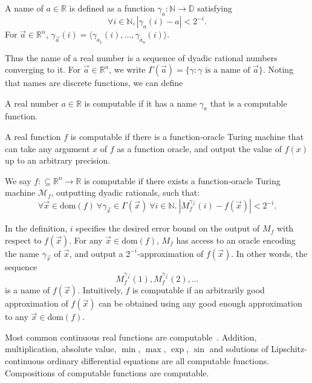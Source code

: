 \documentclass[prodmode]{acmsmall} %
\newcommand{\dom}{\mathrm{dom}}
\begin{document}
\begin{definition}[Names]
A name of $a\in \mathbb{R}$ is defined as a function $\mathcal{\gamma}_a: \mathbb{N}\rightarrow \mathbb{D}$ satisfying 
$$\forall i\in \mathbb{N}, |\gamma_a(i) - a|<2^{-i}.$$
For $\vec a\in \mathbb{R}^n$, $\gamma_{\vec a}(i) = \langle \gamma_{a_1}(i), ..., \gamma_{a_n}(i)\rangle$.  
\end{definition}
Thus the name of a real number is a sequence of dyadic rational numbers converging to it. For $\vec a\in \mathbb{R}^n$, we write $\Gamma(\vec a) = \{\gamma: \gamma\mbox{ is a name of }\vec a\}$. Noting that names are discrete functions, we can define
\begin{definition}
A real number $a\in \mathbb{R}$ is computable if it has a name $\gamma_{a}$ that is a computable function. 
\end{definition}

A real function $f$ is computable if there is a function-oracle Turing machine that can take any argument $x$ of $f$ as a function oracle, and output the value of $f(x)$ up to an arbitrary precision. 

\begin{definition}
We say $f:\subseteq\mathbb{R}^n\rightarrow \mathbb{R}$ is computable if there exists a function-oracle Turing machine $\mathcal{M}_f$, outputting dyadic rationals, such that: 
$$\forall \vec x \in \dom(f)\ \forall \gamma_{\vec x}\in \Gamma(\vec x)\ \forall i \in \mathbb{N}.\ |M_f^{\gamma_{\vec x}}(i) - f(\vec x)|<2^{-i}.$$
\end{definition}

In the definition, $i$ specifies the desired error bound on the output of $M_f$ with respect to $f(\vec x)$. For any $\vec x\in \dom(f)$, $M_f$ has access to an oracle encoding the name $\gamma_{\vec x}$ of $\vec x$, and output a $2^{-i}$-approximation of $f(\vec x)$. In other words, the sequence 
$$M_f^{\gamma_{\vec x}}(1), M_f^{\gamma_{\vec x}}(2), ... $$
is a name of $f(\vec x)$. Intuitively, $f$ is computable if an arbitrarily good approximation of $f(\vec x)$ can be obtained using any good enough approximation to any $\vec x\in\dom(f)$.

Most common continuous real functions are computable~\cite{CAbook}. Addition, multiplication, absolute value, $\min$, $\max$, $\exp$, $\sin$ and solutions of Lipschitz-continuous ordinary differential equations are all computable functions. Compositions of computable functions are computable.  
\end{document}
